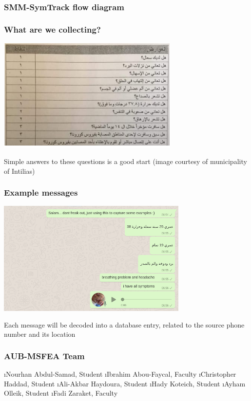 \documentclass[t,xcolor=pdftex,dvipsnames,table]{beamer}
\begin{document}
\begin{wideframe}
  \frametitle{SMM-SymTrack flow diagram } 
   
\end{wideframe}


\begin{wideframe}
  \frametitle{What are we collecting?} 
  \includegraphics[width=.8\textwidth,height=5.7cm]{jpgs/symptoms} 

  Simple answers to these questions is a good start 
  (image courtesy of municipality of Intilias)
  
\end{wideframe} 

\begin{wideframe}
  \frametitle{Example messages } 
  \includegraphics[width=.8\textwidth,height=5.7cm]{jpgs/examples} 

  Each message will be decoded into a database entry, 
  related to the source phone number and its location
\end{wideframe} 


\begin{wideframe}
  \frametitle{AUB-MSFEA Team} 
  \be 
  \i Nourhan Abdul-Samad, Student
  \i Ibrahim Abou-Faycal, Faculty 
  \i Christopher Haddad, Student 
  \i Ali-Akbar Haydoura, Student
  \i Hady Koteich, Student 
  \i Ayham Olleik, Student 
  \i Fadi Zaraket, Faculty 
  \ee 
\end{wideframe} 
\end{document}
